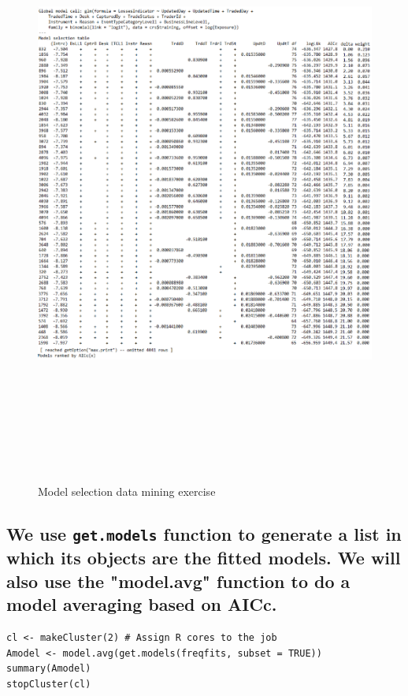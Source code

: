 \documentclass{DissertateUSU}
\begin{document}
\begin{figure}
\centering
\includegraphics[height=20cm, width=15cm]{Dredge_bin.eps}
\caption[Data dredging]{Model selection data mining exercise}
\label{Dredge}
\end{figure}

\subsection{We use \texttt{get.models} function to generate a list in which its objects are the fitted models. We will also use the "model.avg" function to do a model averaging based on AICc.}
\label{sec:Model averaging function}

\small

\begin{verbatim}
cl <- makeCluster(2) # Assign R cores to the job 
Amodel <- model.avg(get.models(freqfits, subset = TRUE))
summary(Amodel)
stopCluster(cl) 
\end{verbatim}
\end{document}
